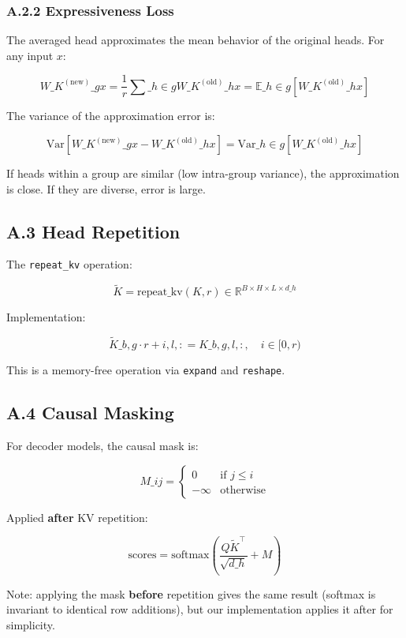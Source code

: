 \subsubsection{A.2.2 Expressiveness Loss}

The averaged head approximates the mean behavior of the original heads. 
For any input $x$:

\[
W\_K^{(\text{new})}\_g x = \frac{1}{r} \sum\_{h \in g} W\_K^{(\text{old})}\_h x = \mathbb{E}\_{h \in g}[W\_K^{(\text{old})}\_h x]
\tag{A.7}
\]

The variance of the approximation error is:

\[
\text{Var}[W\_K^{(\text{new})}\_g x - W\_K^{(\text{old})}\_h x] = \text{Var}\_{h \in g}[W\_K^{(\text{old})}\_h x]
\tag{A.8}
\]

If heads within a group are similar (low intra-group variance), the 
approximation is close. If they are diverse, error is large.

\subsection{A.3 Head Repetition}

The \texttt{repeat\_kv} operation:

\[
\tilde{K} = \text{repeat\_kv}(K, r) \in \mathbb{R}^{B \times H \times L \times d\_h}
\tag{A.9}
\]

Implementation:

\[
\tilde{K}\_{b, g \cdot r + i, l, :} = K\_{b, g, l, :}, \quad i \in [0, r)
\tag{A.10}
\]

This is a memory-free operation via \texttt{expand} and \texttt{reshape}.

\subsection{A.4 Causal Masking}

For decoder models, the causal mask is:

\[
M\_{ij} = \begin{cases} 0 & \text{if } j \le i \\ -\infty & \text{otherwise} \end{cases}
\tag{A.11}
\]

Applied \textbf{after} KV repetition:

\[
\text{scores} = \text{softmax}\!\left(\frac{Q \tilde{K}^\top}{\sqrt{d\_h}} + M\right)
\tag{A.12}
\]

Note: applying the mask \textbf{before} repetition gives the same result 
(softmax is invariant to identical row additions), but our implementation 
applies it after for simplicity.

